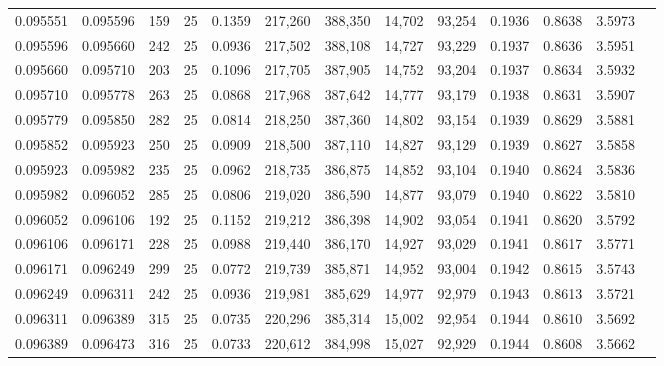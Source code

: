 \begin{tabular}{rrrrrrrrrrrrr}
0.095551 & 0.095596 &   159 &  25 &                                     0.1359 & 217,260 & 388,350 &  14,702 &  93,254 & 0.1936 & 0.8638 & 3.5973 \\
0.095596 & 0.095660 &   242 &  25 &                                     0.0936 & 217,502 & 388,108 &  14,727 &  93,229 & 0.1937 & 0.8636 & 3.5951 \\
0.095660 & 0.095710 &   203 &  25 &                                     0.1096 & 217,705 & 387,905 &  14,752 &  93,204 & 0.1937 & 0.8634 & 3.5932 \\
0.095710 & 0.095778 &   263 &  25 &                                     0.0868 & 217,968 & 387,642 &  14,777 &  93,179 & 0.1938 & 0.8631 & 3.5907 \\
0.095779 & 0.095850 &   282 &  25 &                                     0.0814 & 218,250 & 387,360 &  14,802 &  93,154 & 0.1939 & 0.8629 & 3.5881 \\
0.095852 & 0.095923 &   250 &  25 &                                     0.0909 & 218,500 & 387,110 &  14,827 &  93,129 & 0.1939 & 0.8627 & 3.5858 \\
0.095923 & 0.095982 &   235 &  25 &                                     0.0962 & 218,735 & 386,875 &  14,852 &  93,104 & 0.1940 & 0.8624 & 3.5836 \\
0.095982 & 0.096052 &   285 &  25 &                                     0.0806 & 219,020 & 386,590 &  14,877 &  93,079 & 0.1940 & 0.8622 & 3.5810 \\
0.096052 & 0.096106 &   192 &  25 &                                     0.1152 & 219,212 & 386,398 &  14,902 &  93,054 & 0.1941 & 0.8620 & 3.5792 \\
0.096106 & 0.096171 &   228 &  25 &                                     0.0988 & 219,440 & 386,170 &  14,927 &  93,029 & 0.1941 & 0.8617 & 3.5771 \\
0.096171 & 0.096249 &   299 &  25 &                                     0.0772 & 219,739 & 385,871 &  14,952 &  93,004 & 0.1942 & 0.8615 & 3.5743 \\
0.096249 & 0.096311 &   242 &  25 &                                     0.0936 & 219,981 & 385,629 &  14,977 &  92,979 & 0.1943 & 0.8613 & 3.5721 \\
0.096311 & 0.096389 &   315 &  25 &                                     0.0735 & 220,296 & 385,314 &  15,002 &  92,954 & 0.1944 & 0.8610 & 3.5692 \\
0.096389 & 0.096473 &   316 &  25 &                                     0.0733 & 220,612 & 384,998 &  15,027 &  92,929 & 0.1944 & 0.8608 & 3.5662 \\

\end{tabular}
